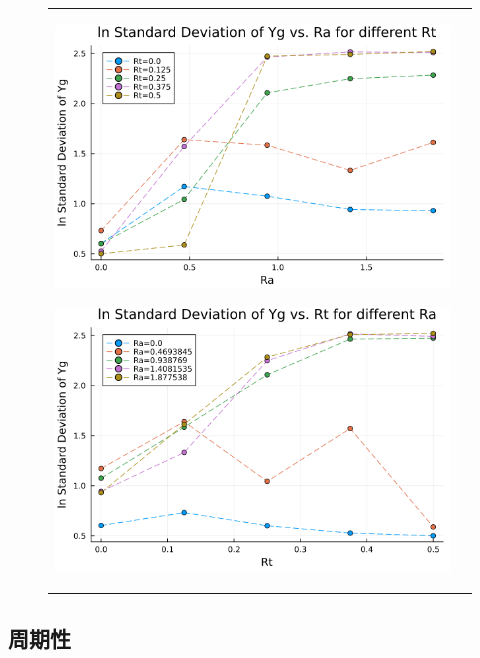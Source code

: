 \begin{figure}[H]
  \begin{tabular}{cc}
    \begin{minipage}[t]{0.5\hsize}
      \centering
      \includegraphics[width=\textwidth]{image/lnStdYg_Ra0.0to1.877538_Rt0.0to0.5_ti25000.png}
      \subcaption{}
      \label{}
    \end{minipage}
    \begin{minipage}[t]{0.5\hsize}
      \centering
      \includegraphics[width=\textwidth]{image/lnStdYg_Rt0.0to0.5_Ra0.0to1.877538_ti25000.png}
      \subcaption{}
      \label{}
    \end{minipage}
  \end{tabular}
  \caption{}
  \label{}
\end{figure}

\subsection{周期性}

